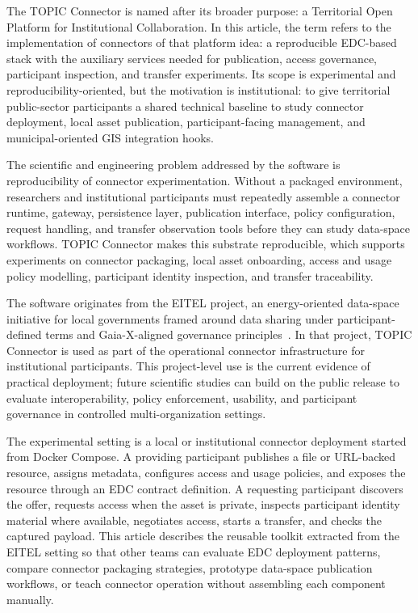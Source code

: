 \documentclass[a4paper,fleqn]{cas-dc}
\begin{document}
The TOPIC Connector is named after its broader purpose: a Territorial Open Platform for Institutional Collaboration. In this article, the term refers to the implementation of connectors of that platform idea: a reproducible EDC-based stack with the auxiliary services needed for publication, access governance, participant inspection, and transfer experiments. Its scope is experimental and reproducibility-oriented, but the motivation is institutional: to give territorial public-sector participants a shared technical baseline to study connector deployment, local asset publication, participant-facing management, and municipal-oriented GIS integration hooks.

The scientific and engineering problem addressed by the software is reproducibility of connector experimentation. Without a packaged environment, researchers and institutional participants must repeatedly assemble a connector runtime, gateway, persistence layer, publication interface, policy configuration, request handling, and transfer observation tools before they can study data-space workflows. TOPIC Connector makes this substrate reproducible, which supports experiments on connector packaging, local asset onboarding, access and usage policy modelling, participant identity inspection, and transfer traceability.

The software originates from the EITEL project, an energy-oriented data-space initiative for local governments framed around data sharing under participant-defined terms and Gaia-X-aligned governance principles~\cite{b18}. In that project, TOPIC Connector is used as part of the operational connector infrastructure for institutional participants. This project-level use is the current evidence of practical deployment; future scientific studies can build on the public release to evaluate interoperability, policy enforcement, usability, and participant governance in controlled multi-organization settings.

The experimental setting is a local or institutional connector deployment started from Docker Compose. A providing participant publishes a file or URL-backed resource, assigns metadata, configures access and usage policies, and exposes the resource through an EDC contract definition. A requesting participant discovers the offer, requests access when the asset is private, inspects participant identity material where available, negotiates access, starts a transfer, and checks the captured payload. This article describes the reusable toolkit extracted from the EITEL setting so that other teams can evaluate EDC deployment patterns, compare connector packaging strategies, prototype data-space publication workflows, or teach connector operation without assembling each component manually.
\end{document}
